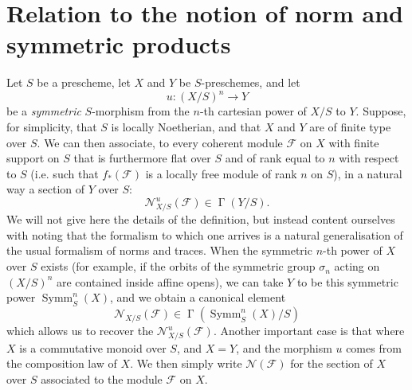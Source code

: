 \section{Relation to the notion of norm and symmetric products}\label{fga3.iv-6}


  Let $S$ be a prescheme, let $X$ and $Y$ be $S$-preschemes, and let
  \[
    u\colon(X/S)^n\to Y
  \]
  be a \emph{symmetric} $S$-morphism from the $n$-th cartesian power of $X/S$ to $Y$.
  Suppose, for simplicity, that $S$ is locally Noetherian, and that $X$ and $Y$ are of finite type over $S$.
  We can then associate, to every coherent module $\mathcal{F}$ on $X$ with finite support on $S$ that is furthermore flat over $S$ and of rank equal to $n$ with respect to $S$ (i.e. such that $f_*(\mathcal{F})$ is a locally free module of rank $n$ on $S$), in a natural way a section of $Y$ over $S$:
  \[
    \mathcal{N}_{X/S}^u(\mathcal{F}) \in \operatorname{\Gamma}(Y/S).
  \]
  We will not give here the details of the definition, but instead content ourselves with noting that the formalism to which one arrives is a natural generalisation of the usual formalism of norms and traces.
  When the symmetric $n$-th power of $X$ over $S$ exists (for example, if the orbits of the symmetric group $\sigma_n$ acting on $(X/S)^n$ are contained inside affine opens), we can take $Y$ to be this symmetric power $\operatorname{Symm}_S^n(X)$, and we obtain a canonical element
  \[
    \mathcal{N}_{X/S}(\mathcal{F}) \in \operatorname{\Gamma}(\operatorname{Symm}_S^n(X)/S)
  \]
  which allows us to recover the $\mathcal{N}_{X/S}^u(\mathcal{F})$.
  Another important case is that where $X$ is a commutative monoid over $S$, and $X=Y$, and the morphism $u$ comes from the composition law of $X$.
  We then simply write $\mathcal{N}(\mathcal{F})$ for the section of $X$ over $S$ associated to the module $\mathcal{F}$ on $X$.



